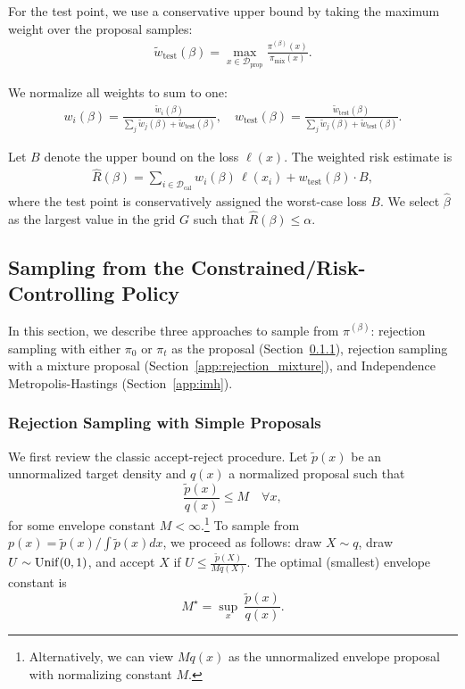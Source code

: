 For the test point, we use a conservative upper bound by taking the maximum weight over the proposal samples:
\begin{align}
    \tilde{w}_{\mathrm{test}}(\beta) = \max_{x \in \mathcal{D}_{\mathrm{prop}}} \frac{\pi^{(\beta)}(x)}{\pi_{\mathrm{mix}}(x)}.
\end{align}

We normalize all weights to sum to one:
\begin{align}
    w_i(\beta) = \frac{\tilde{w}_i(\beta)}{\sum_{j} \tilde{w}_j(\beta) + \tilde{w}_{\mathrm{test}}(\beta)}, \quad
    w_{\mathrm{test}}(\beta) = \frac{\tilde{w}_{\mathrm{test}}(\beta)}{\sum_{j} \tilde{w}_j(\beta) + \tilde{w}_{\mathrm{test}}(\beta)}.
\end{align}

Let $B$ denote the upper bound on the loss $\ell(x)$. The weighted risk estimate is
\begin{align}
    \hat{R}(\beta) = \sum_{i \in \mathcal{D}_{\mathrm{cal}}} w_i(\beta) \, \ell(x_i) + w_{\mathrm{test}}(\beta)\cdot B,
\end{align}
where the test point is conservatively assigned the worst-case loss $B$. We select $\hat{\beta}$ as the largest value in the grid $G$ such that $\hat{R}(\beta) \leq \alpha$.

\subsection{Sampling from the Constrained/Risk-Controlling Policy}
\label{app:sampling}


In this section, we describe three approaches to sample from $\pi^{(\beta)}$: rejection sampling with either $\pi_0$ or $\pi_t$ as the proposal (Section~\ref{app:rejection_simple}), rejection sampling with a mixture proposal (Section~\ref{app:rejection_mixture}), and Independence Metropolis-Hastings (Section~\ref{app:imh}).

\subsubsection{Rejection Sampling with Simple Proposals}
\label{app:rejection_simple}

We first review the classic accept-reject procedure. Let $\tilde p(x)$ be an unnormalized target density and $q(x)$ a normalized proposal such that
$$\frac{\tilde p(x)}{q(x)} \leq M \quad \forall x,$$
for some envelope constant $M < \infty$.\footnote{Alternatively, we can view $M q(x)$ as the unnormalized envelope proposal with normalizing constant $M$.} To sample from $p(x) = \tilde p(x) / \int \tilde p(x) dx$, we proceed as follows: draw $X \sim q$, draw $U \sim {\rm Unif}(0, 1)$, and accept $X$ if $U \leq \frac{\tilde p(X)}{M q(X)}$. The optimal (smallest) envelope constant is
$$M^\star = \sup_x \ \frac{\tilde p(x)}{q(x)}.$$

